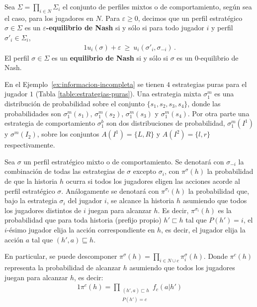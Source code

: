 \begin{definition}
Sea $\Sigma=\prod_{i\in N}\Sigma_i$ el conjunto de perfiles mixtos o de comportamiento, según sea el caso, para los jugadores en $N$.
Para $\varepsilon\geq 0$, decimos que un perfil estratégico $\sigma \in \Sigma$ es un \textbf{$\varepsilon$-equilibrio de Nash} si y sólo si para todo jugador $i$ y perfil $\sigma'_i\in\Sigma_i$,
\begin{alignat}{1}
u_i(\sigma) + \varepsilon\ \geq\ u_i(\sigma'_i, \sigma_{-i}) \,.
\end{alignat}
El perfil $\sigma\in\Sigma$ es un \textbf{equilibrio de Nash} si y sólo si $\sigma$ es un $0$-equilibrio de Nash.
\end{definition}

En el Ejemplo~\ref{ex:informacion-incompleta} se tienen $4$ estrategias puras para el jugador $1$ (Tabla \ref{table:estrategias-puras}). Una estrategia mixta $\sigma^m_1$ es una distribución de probabilidad sobre el conjunto $\{s_1, s_2, s_3, s_4\}$, donde las probabilidades son $\sigma^m_1(s_1)$, $\sigma^m_1(s_2)$, $\sigma^m_1(s_3)$ y $\sigma^m_1(s_4)$. Por otra parte una estrategia de comportamiento $\sigma^b_1$ son dos distribuciones de probabilidad, $\sigma^m_1(I^1)$ y $\sigma^m(I_2)$, sobre los conjuntos $A(I^1) = \{L, R\}$ y $A(I^2) = \{l, r\}$ respectivamente.

Sea $\sigma$ un perfil estratégico mixto o de comportamiento. Se denotará con $\sigma_{-i}$ la combinación de todas las estrategias de $\sigma$ excepto $\sigma_i$, con $\pi^{\sigma}(h)$ la probabilidad de que la historia $h$ ocurra si todos los jugadores eligen las acciones acorde al perfil estratégico  $\sigma$. Análogamente se denotará con $\pi^{\sigma_i}(h)$ la probabilidad que, bajo la estrategia $\sigma_i$ del jugador $i$, se alcance la historia $h$ asumiendo que todos los jugadores distintos de $i$ juegan para alcanzar $h$. Es decir, $\pi^{\sigma_i}(h)$ es la probabilidad que para toda historia (prefijo propio) $h' \sqsubset h$ tal que $P(h') = i$, el $i$-ésimo jugador elija la acción correspondiente en $h$, es decir, el jugador elija la acción $a$ tal que $(h', a) \sqsubseteq h$.

En particular, se puede descomponer $\pi^{\sigma}(h) = \prod_{i \in N \cup {c}} \pi^\sigma_i(h)$. Donde $\pi^c(h)$ representa la probabilidad de alcanzar $h$ asumiendo que todos los jugadores juegan para alcanzar $h$, es decir:
\begin{alignat}{1}
\pi^c(h) = \prod_{\substack{(h', a) \sqsubset h \\ P(h') = c}} f_c(a | h')
\end{alignat}

